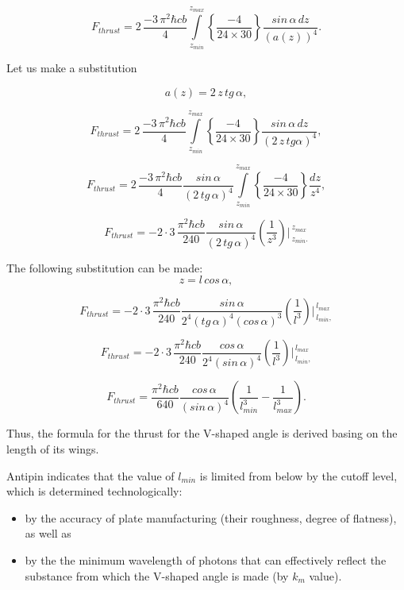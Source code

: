 \documentclass[twoside, 10pt, ptm]{article}
\begin{document}
\begin{multicols}{2}
\noindent
\begin{equation}F_{thrust} = 2\, \frac{-3\,\pi^2\hbar c b}{4}\int\limits_{z_{min}}^{z_{max}} \left\{\frac{-4}{24\times30}\right\}\frac{sin\, \alpha\,dz}{\left(a\left(z\right)\right)^4}.\end{equation}

Let us make a substitution

\[a\left(z\right) = 2\,z\,tg\, \alpha,\]

\[F_{thrust} = 2\, \frac{-3\,\pi^2\hbar c b}{4}\int\limits_{z_{min}}^{z_{max}} \left\{\frac{-4}{24\times30}\right\}\frac{sin\, \alpha\,dz}{\left(2\,z\,tg \alpha\right)^4},\]

\[F_{thrust} = 2\, \frac{-3\,\pi^2\hbar c b}{4} \frac{sin\, \alpha}{\left(2\,tg\, \alpha\right)^4} \int\limits_{z_{min}}^{z_{max}} \left\{\frac{-4}{24\times30}\right\} \frac{dz}{z^4},\]

\[F_{thrust} = -2\cdot3\, \frac{\pi^2\hbar c b}{240} \frac{sin\, \alpha}{\left(2\,tg\, \alpha\right)^4} \left(\frac{1}{z^3}\right)\Bigg\rvert_{\,z_{min}.}^{\,z_{max}} \]

    The following substitution can be made: \[z = l\, cos\, \alpha,\]

\[F_{thrust} = -2\cdot3\, \frac{\pi^2\hbar c b}{240} \frac{sin\, \alpha}{2^4\left(tg\,\alpha\right)^4\left(cos\, \alpha\right)^3} \left(\frac{1}{l^3}\right)\Bigg\rvert_{\,l_{min},}^{\,l_{max}} \]

\[F_{thrust} = -2\cdot3\, \frac{\pi^2\hbar c b}{240} \frac{cos\, \alpha}{2^4\left(sin\, \alpha\right)^4} \left(\frac{1}{l^3}\right)\Bigg\rvert_{\,l_{min},}^{\,l_{max}} \]

\noindent
\begin{equation}F_{thrust} = \frac{\pi^2\hbar c b}{640} \frac{cos\, \alpha}{\left(sin\, \alpha\right)^4} \left(\frac{1}{l_{min}^3} - \frac{1}{l_{max}^3}\right).\end{equation}

Thus, the formula for the thrust for the V-shaped angle is derived basing on the
length of its wings.

Antipin indicates that the value of \(l_{min}\) is limited from below by
the {\glqq}cutoff{\grqq} level, which is determined technologically:

\begin{itemize}
\item
  by the accuracy of plate manufacturing (their roughness,
  degree of flatness), as well as
\item
  by the the minimum wavelength of photons that can effectively reflect
  the substance from which the V-shaped angle is made (by \(k_m\) value).
\end{itemize}


\end{multicols}
\end{document}
